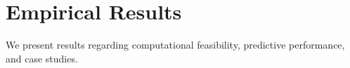 {					%
					
					
					
					\section{Empirical Results}
					
					We present results regarding computational feasibility, 
					predictive performance, and case studies.
					
}
